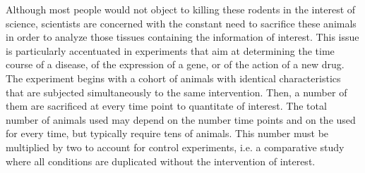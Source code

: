 Although most people would not object to killing these rodents in the interest of science, scientists are concerned with the constant need to sacrifice these animals in order to analyze those tissues containing the information of interest. This issue is particularly accentuated in experiments that aim at determining the time course of a disease, of the expression of a gene, or of the action of a new drug. The experiment begins with a cohort of animals with identical characteristics that are subjected simultaneously to the same intervention. Then, a number of them are sacrificed at every time point to quantitate of interest. The total number of animals used may depend on the number time points and on the used for every time, but typically require tens of animals. This number must be multiplied by two to account for control experiments, i.e. a comparative study where all conditions are duplicated without the intervention of interest.

